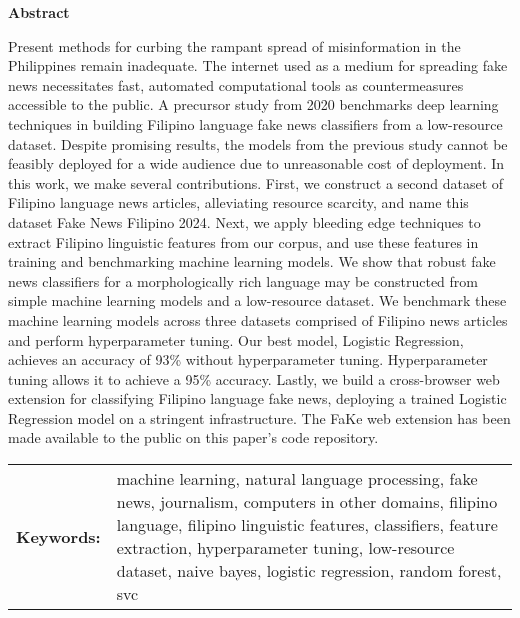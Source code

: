 
\begin{center}
    \textbf{Abstract}
    \end{center}
    \setlength{\parindent}{0pt}
    Present methods for curbing the rampant spread of misinformation in the Philippines remain inadequate. The internet used as a medium for spreading fake news necessitates fast, automated computational tools as countermeasures accessible to the public. A precursor study from 2020 benchmarks deep learning techniques in building Filipino language fake news classifiers from a low-resource dataset. Despite promising results, the models from the previous study cannot be feasibly deployed for a wide audience due to unreasonable cost of deployment. In this work, we make several contributions. First, we construct a second dataset of Filipino language news articles, alleviating resource scarcity, and name this dataset Fake News Filipino 2024. Next, we apply bleeding edge techniques to extract Filipino linguistic features from our corpus, and use these features in training and benchmarking machine learning models. We show that robust fake news classifiers for a morphologically rich language may be constructed from simple machine learning models and a low-resource dataset. We benchmark these machine learning models across three datasets comprised of Filipino news articles and perform hyperparameter tuning. Our best model, Logistic Regression, achieves an accuracy of 93\% without hyperparameter tuning. Hyperparameter tuning allows it to achieve a 95\% accuracy. Lastly, we build a cross-browser web extension for classifying Filipino language fake news, deploying a trained Logistic Regression model on a stringent infrastructure. The FaKe web extension has been made available to the public on this paper's code repository.
    
    
    \begin{tabular}{lp{4.25in}}
    \hspace{-0.5em}\textbf{Keywords:}\hspace{0.25em} & machine learning, natural language processing, fake news, journalism, computers in other domains, filipino language, filipino linguistic features, classifiers, feature extraction, hyperparameter tuning, low-resource dataset, naive bayes, logistic regression, random forest, svc\\
\end{tabular}
    
    